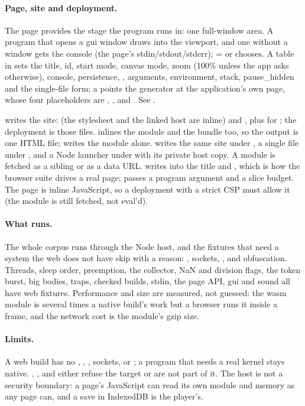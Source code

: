 \paragraph{Page, site and deployment.} The page provides the stage the
program runs in: one full-window area.  A program that opens a gui window
draws into the viewport, and one without a window gets the console (the page's
stdin/stdout/stderr);  =  or  chooses.
A \ic{[web]} table in  sets the
title, id, start mode, canvas mode, zoom (100\% unless the app asks otherwise),
console, persistence, , arguments, environment, stack,
pause\_hidden and the single-file form; a  points the generator
at the application's own page, whose four placeholders are ,
,  and .  See .

 writes the site:  (the stylesheet and the
linked host are inline) and , plus  for
; the deployment is those files.  
inlines the module and the bundle too, so the output is one HTML file;
 writes the module alone.   writes
the same site under , a single file under
, and a Node launcher under 
with its private host copy.  A module is fetched as a sibling or as a data URL.
 writes  into the title and ,
which is how the browser suite drives a real page;  passes a program
argument and  a slice budget.  The page is inline JavaScript, so a
deployment with a strict CSP must allow it (the module is still fetched, not
eval'd).

\paragraph{What runs.} The whole  corpus runs through the
Node host, and the fixtures that need a system the web does not have skip
with a reason: , sockets, , and obfuscation.  Threads,
sleep order, preemption, the collector, NaN and division flags, the token
burst, big bodies, traps, checked builds, stdin, the page API, gui and sound
all have web fixtures.
Performance and size are measured, not guessed: the wasm module is several
times a native build's work but a browser runs it inside a frame, and the
network cost is the module's gzip size.

\paragraph{Limits.} A web build has no , , ,
sockets,  or ; a program that needs a real
kernel stays native.  , ,  and
 either refuse the target or are not part of it.  The host is not a
security boundary: a page's JavaScript can read its own module and memory as
any page can, and a save in IndexedDB is the player's.
